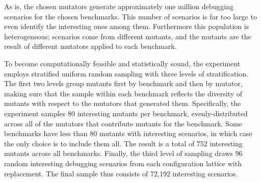 

As is, the chosen mutators generate approximately one million debugging
scenarios for the chosen benchmarks. This number of scenarios is far too large
to even identify the interesting ones among them.  Furthermore this population
is heterogeneous; scenarios come from different mutants, and the mutants are the
result of different mutators applied to each benchmark.

To become computationally feasible and statistically sound, the experiment employs
stratified uniform random sampling with three levels of stratification.
The first two levels group mutants first by benchmark and then by
mutator, making sure that the sample within each benchmark reflects the diversity of
mutants with respect to the mutators that generated them.  Specifically, the
experiment samples 80 interesting mutants per benchmark,
evenly-distributed across all of the mutators that contribute mutants for the
benchmark. Some benchmarks have less than  80 mutants with interesting scenarios,
in which case the only choice is to include them all.
The result is a total of 752 interesting mutants across all benchmarks.
Finally, the third level of sampling draws 96 random interesting debugging
scenarios from each configuration lattice with replacement. The
final sample thus consists of 72,192 interesting scenarios.



